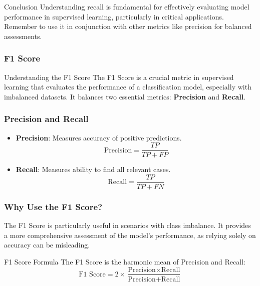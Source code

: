 \documentclass[aspectratio=169]{beamer}
\begin{document}
\begin{frame}[fragile]{Conclusion}
    Understanding recall is fundamental for effectively evaluating model performance in supervised learning, particularly in critical applications. Remember to use it in conjunction with other metrics like precision for balanced assessments.
\end{frame}

\begin{frame}[fragile]
    \frametitle{F1 Score}
    \begin{block}{Understanding the F1 Score}
        The F1 Score is a crucial metric in supervised learning that evaluates the performance of a classification model, especially with imbalanced datasets. It balances two essential metrics: \textbf{Precision} and \textbf{Recall}.
    \end{block}
\end{frame}

\begin{frame}[fragile]
    \frametitle{Precision and Recall}
    \begin{itemize}
        \item \textbf{Precision}: Measures accuracy of positive predictions. 
        \begin{equation}
            \text{Precision} = \frac{TP}{TP + FP}
        \end{equation}
        \item \textbf{Recall}: Measures ability to find all relevant cases.
        \begin{equation}
            \text{Recall} = \frac{TP}{TP + FN}
        \end{equation}
    \end{itemize}
\end{frame}

\begin{frame}[fragile]
    \frametitle{Why Use the F1 Score?}
    The F1 Score is particularly useful in scenarios with class imbalance. It provides a more comprehensive assessment of the model's performance, as relying solely on accuracy can be misleading.

    \begin{block}{F1 Score Formula}
        The F1 Score is the harmonic mean of Precision and Recall:
        \begin{equation}
            \text{F1 Score} = 2 \times \frac{\text{Precision} \times \text{Recall}}{\text{Precision} + \text{Recall}}
        \end{equation}
    \end{block}
\end{frame}
\end{document}
